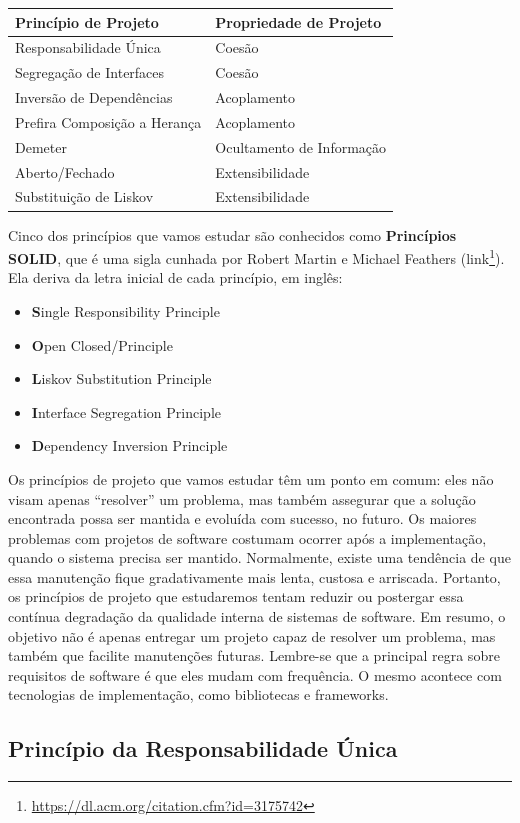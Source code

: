 \documentclass[
  11pt,
  twoside]{book}
\DeclareRobustCommand{\href}[2]{#2\footnote{\url{#1}}}
\providecommand{\tightlist}{%
  \setlength{\itemsep}{0pt}\setlength{\parskip}{0pt}}
\begin{document}
\begin{longtable}[]{@{}ll@{}}
\toprule
\textbf{Princípio de Projeto} & \textbf{Propriedade de
Projeto}\tabularnewline
\midrule
\endhead
Responsabilidade Única & Coesão\tabularnewline
Segregação de Interfaces & Coesão\tabularnewline
Inversão de Dependências & Acoplamento\tabularnewline
Prefira Composição a Herança & Acoplamento\tabularnewline
Demeter & Ocultamento de Informação\tabularnewline
Aberto/Fechado & Extensibilidade\tabularnewline
Substituição de Liskov & Extensibilidade\tabularnewline
\bottomrule
\end{longtable}

  Cinco dos
princípios que vamos estudar são conhecidos como \textbf{Princípios
SOLID}, que é uma sigla cunhada por Robert Martin e Michael Feathers
(\href{https://dl.acm.org/citation.cfm?id=3175742}{link}). Ela deriva da
letra inicial de cada princípio, em inglês:

\begin{itemize}
\tightlist
\item
  \textbf{S}ingle Responsibility Principle
\item
  \textbf{O}pen Closed/Principle
\item
  \textbf{L}iskov Substitution Principle
\item
  \textbf{I}nterface Segregation Principle
\item
  \textbf{D}ependency Inversion Principle
\end{itemize}

Os princípios de projeto que vamos estudar têm um ponto em comum: eles
não visam apenas ``resolver'' um problema, mas também assegurar que a
solução encontrada possa ser mantida e evoluída com sucesso, no futuro.
Os maiores problemas com projetos de software costumam ocorrer após a
implementação, quando o sistema precisa ser mantido. Normalmente, existe
uma tendência de que essa manutenção fique gradativamente mais lenta,
custosa e arriscada. Portanto, os princípios de projeto que estudaremos
tentam reduzir ou postergar essa contínua degradação da qualidade
interna de sistemas de software. Em resumo, o objetivo não é apenas
entregar um projeto capaz de resolver um problema, mas também que
facilite manutenções futuras. Lembre-se que a principal regra sobre
requisitos de software é que eles mudam com frequência. O mesmo acontece
com tecnologias de implementação, como bibliotecas e frameworks.

\hypertarget{princuxedpio-da-responsabilidade-uxfanica}{%
\subsection{Princípio da Responsabilidade
Única}\label{princuxedpio-da-responsabilidade-uxfanica}}
\end{document}
